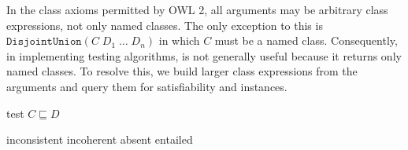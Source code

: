 \documentclass[paper.tex]{subfiles}
\begin{document}
In the class axioms permitted by OWL 2, all arguments may be arbitrary class expressions, not only named classes.  The only exception to this is $\mathtt{DisjointUnion}(C \; D_1 \; \ldots \; D_n)$ in which $C$ must be a named class.  Consequently, in implementing testing algorithms,  is not generally useful because it returns only named classes.  To resolve this, we build larger class expressions from the arguments and query them for satisfiability and instances.

\begin{algorithm}[H]
  \caption{test $C \sqsubseteq D$}
  \begin{algorithmic}[1]
    \raggedright
        \State \Return inconsistent
        \State \Return incoherent
        \State \Return absent
      \Else
        \State \Return entailed
        \label{alg:testSubClassOf:returnEntailed}
      \EndIf
    \EndFunction
  \end{algorithmic}
\end{algorithm}
\end{document}
